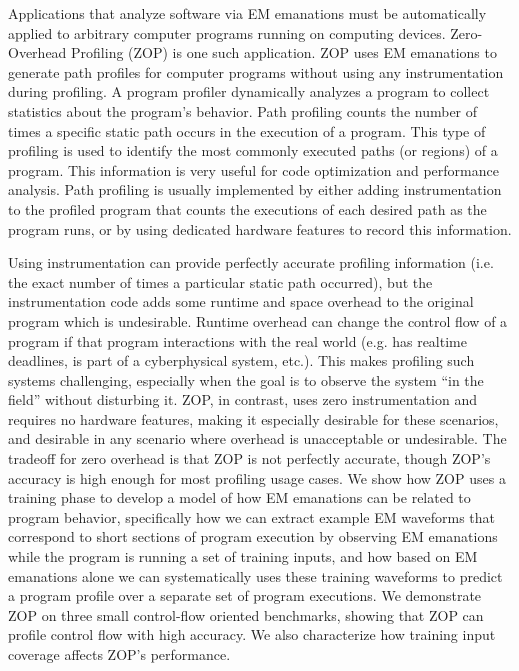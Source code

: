 Applications that analyze software via EM emanations must be automatically applied to arbitrary computer programs running on computing devices. Zero-Overhead Profiling (ZOP) is one such application. ZOP uses EM emanations to generate path profiles for computer programs without using any instrumentation during profiling. A program profiler dynamically analyzes a program to collect statistics about the program's behavior. Path profiling counts the number of times a specific static path occurs in the execution of a program. This type of profiling is used to identify the most commonly executed paths (or regions) of a program. This information is very useful for code optimization and performance analysis. Path profiling is usually implemented by either adding instrumentation to the profiled program that counts the executions of each desired path as the program runs, or by using dedicated hardware features to record this information. 

Using instrumentation can provide perfectly accurate profiling information (i.e. the exact number of times a particular static path occurred), but the instrumentation code adds some runtime and space overhead to the original program which is undesirable. Runtime overhead can change the control flow of a program if that program interactions with the real world (e.g. has realtime deadlines, is part of a cyberphysical system, etc.). This makes profiling such systems challenging, especially when the goal is to observe the system ``in the field'' without disturbing it. ZOP, in contrast, uses zero instrumentation and requires no hardware features, making it especially desirable for these scenarios, and desirable in any scenario where overhead is unacceptable or undesirable. The tradeoff for zero overhead is that ZOP is not perfectly accurate, though ZOP's accuracy is high enough for most profiling usage cases. We show how ZOP uses a training phase to develop a model of how EM emanations can be related to program behavior, specifically how we can extract example EM waveforms that correspond to short sections of program execution by observing EM emanations while the program is running a set of training inputs, and how based on EM emanations alone we can systematically uses these training waveforms to predict a program profile over a separate set of program executions. We demonstrate ZOP on three small control-flow oriented benchmarks, showing that ZOP can profile control flow with high accuracy. We also characterize how training input coverage affects ZOP's performance. 

